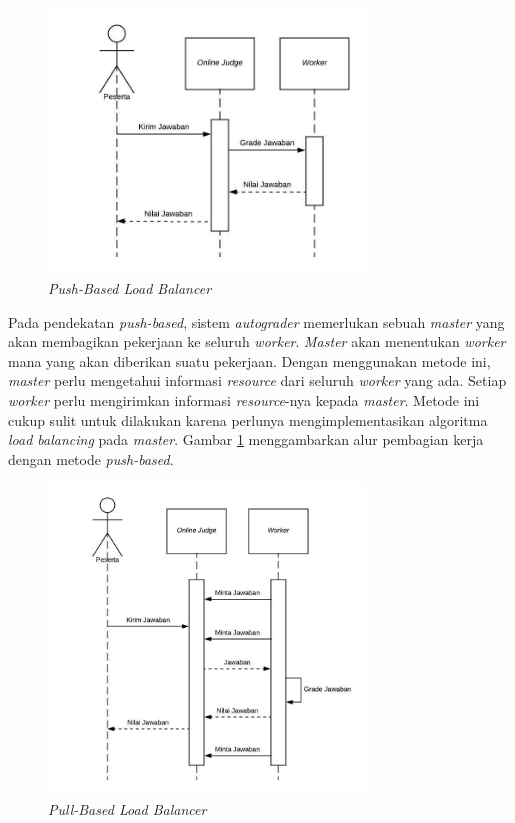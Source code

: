 \begin{figure}
    \centering
    \includegraphics[width=0.75\textwidth]{images/load-balancing-push}
    \caption{\textit{Push-Based Load Balancer}}
    \label{fig:load-balancing-push}
\end{figure}

\par Pada pendekatan \textit{push-based}, sistem \textit{autograder} memerlukan sebuah \textit{master} yang akan membagikan pekerjaan ke seluruh \textit{worker}. \textit{Master} akan menentukan \textit{worker} mana yang akan diberikan suatu pekerjaan. Dengan menggunakan metode ini, \textit{master} perlu mengetahui informasi \textit{resource} dari seluruh \textit{worker} yang ada. Setiap \textit{worker} perlu mengirimkan informasi \textit{resource}-nya kepada \textit{master}. Metode ini cukup sulit untuk dilakukan karena perlunya mengimplementasikan algoritma \textit{load balancing} pada \textit{master}. Gambar \ref{fig:load-balancing-push} menggambarkan alur pembagian kerja dengan metode \textit{push-based}.

\begin{figure}
    \centering
    \includegraphics[width=0.75\textwidth]{images/load-balancing-pull}
    \caption{\textit{Pull-Based Load Balancer}}
    \label{fig:load-balancing-pull}
\end{figure}

